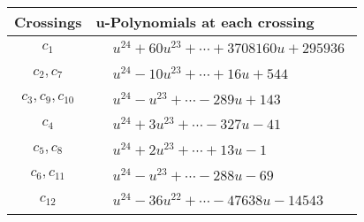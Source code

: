 \documentclass[1p]{elsarticle_modified}
\theoremstyle{definition}
\begin{document}
\begin{tabular}{m{50pt}|m{274pt}}
Crossings & \hspace{64pt}u-Polynomials at each crossing \\
\hline $$\begin{aligned}c_{1}\end{aligned}$$&$\begin{aligned}
&u^{24}+60 u^{23}+\cdots+3708160 u+295936
\end{aligned}$\\
\hline $$\begin{aligned}c_{2},c_{7}\end{aligned}$$&$\begin{aligned}
&u^{24}-10 u^{23}+\cdots+16 u+544
\end{aligned}$\\
\hline $$\begin{aligned}c_{3},c_{9},c_{10}\end{aligned}$$&$\begin{aligned}
&u^{24}- u^{23}+\cdots-289 u+143
\end{aligned}$\\
\hline $$\begin{aligned}c_{4}\end{aligned}$$&$\begin{aligned}
&u^{24}+3 u^{23}+\cdots-327 u-41
\end{aligned}$\\
\hline $$\begin{aligned}c_{5},c_{8}\end{aligned}$$&$\begin{aligned}
&u^{24}+2 u^{23}+\cdots+13 u-1
\end{aligned}$\\
\hline $$\begin{aligned}c_{6},c_{11}\end{aligned}$$&$\begin{aligned}
&u^{24}- u^{23}+\cdots-288 u-69
\end{aligned}$\\
\hline $$\begin{aligned}c_{12}\end{aligned}$$&$\begin{aligned}
&u^{24}-36 u^{22}+\cdots-47638 u-14543
\end{aligned}$\\
\hline
\end{tabular}\\~\\
\newpage\renewcommand{\arraystretch}{1}
\end{document}
